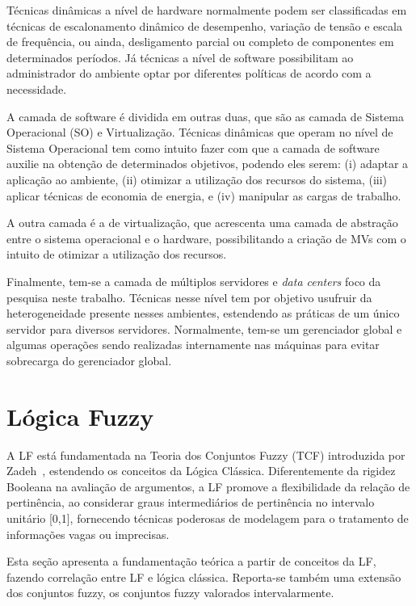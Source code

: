 \documentclass[tcc,capa]{texufpel}
\begin{document}
Técnicas dinâmicas a nível de hardware normalmente podem ser classificadas em técnicas de escalonamento dinâmico de desempenho, variação de tensão e escala de frequência, ou ainda, desligamento parcial ou completo de componentes em determinados períodos. Já técnicas a nível de software possibilitam ao administrador do ambiente optar por diferentes políticas de acordo com a necessidade. 

A camada de software é dividida em outras duas, que são as camada de Sistema Operacional (SO) e Virtualização. Técnicas dinâmicas que operam no nível de Sistema Operacional tem como intuito fazer com que a camada de software auxilie na obtenção de determinados objetivos, podendo eles serem: (i) adaptar a aplicação ao ambiente, (ii) otimizar a utilização dos recursos do sistema, (iii) aplicar técnicas de economia de energia, e (iv) manipular as cargas de trabalho. 

A outra camada é a de virtualização, que acrescenta uma camada de abstração entre o sistema operacional e o hardware, possibilitando a criação de MVs com o intuito de otimizar a utilização dos recursos.

Finalmente, tem-se a camada de múltiplos servidores e \textit{data centers} foco da pesquisa neste trabalho. Técnicas nesse nível tem por objetivo usufruir da heterogeneidade presente nesses ambientes, estendendo as práticas de um único servidor para diversos servidores. Normalmente, tem-se um gerenciador global e algumas operações sendo realizadas internamente nas máquinas para evitar sobrecarga do gerenciador global.


\chapter{Lógica Fuzzy} \label{sec:fuzzy}

A LF está fundamentada na Teoria dos Conjuntos Fuzzy (TCF) introduzida por Zadeh~\cite{zadeh1965, zadeh2008there}, estendendo os conceitos da Lógica Clássica. Diferentemente da rigidez Booleana na avaliação de argumentos, a LF promove a flexibilidade da relação de pertinência, ao considerar graus intermediários de pertinência no intervalo unitário [0,1], fornecendo técnicas poderosas de modelagem para o tratamento de informações vagas ou imprecisas. 

Esta seção apresenta a fundamentação teórica a partir de conceitos da LF, fazendo correlação entre LF e lógica clássica. Reporta-se também uma extensão dos conjuntos fuzzy, os conjuntos fuzzy valorados intervalarmente.
\end{document}
